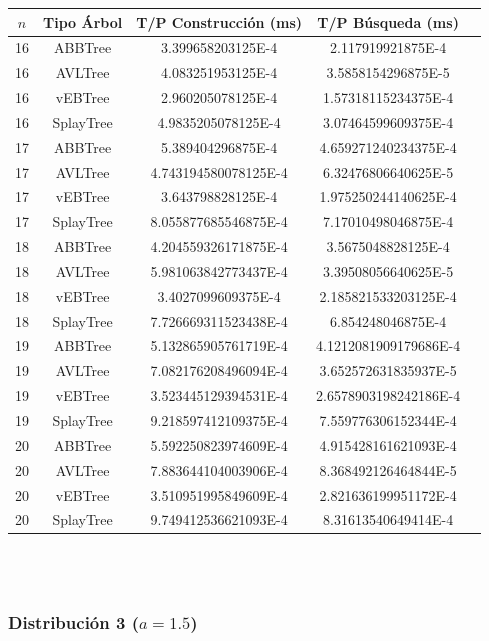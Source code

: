 \documentclass[letterpaper,12pt]{article}
\begin{document}
\begin{tabular}{|c|c|c|c|c|}
\hline
\textbf{$n$} & \textbf{Tipo Árbol} & \textbf{T/P Construcción (ms)} & \textbf{T/P Búsqueda (ms)} \\
\hline
16 & ABBTree & 3.399658203125E-4 & 2.117919921875E-4 \\
\hline
16 & AVLTree & 4.083251953125E-4  & 3.5858154296875E-5 \\
\hline
16 & vEBTree & 2.960205078125E-4  & 1.57318115234375E-4 \\
\hline
16 & SplayTree & 4.9835205078125E-4 & 3.07464599609375E-4 \\
\hline
\hline
17 & ABBTree & 5.389404296875E-4  & 4.659271240234375E-4 \\
\hline
17 & AVLTree & 4.743194580078125E-4 & 6.32476806640625E-5 \\
\hline
17 & vEBTree & 3.643798828125E-4  & 1.975250244140625E-4\\
\hline
17 & SplayTree & 8.055877685546875E-4 & 7.17010498046875E-4 \\
\hline
\hline
18 & ABBTree & 4.204559326171875E-4 & 3.5675048828125E-4 \\
\hline
18 & AVLTree & 5.981063842773437E-4 & 3.39508056640625E-5 \\
\hline
18 & vEBTree & 3.4027099609375E-4 & 2.185821533203125E-4 \\
\hline
18 & SplayTree & 7.726669311523438E-4  & 6.854248046875E-4 \\
\hline
\hline
19 & ABBTree & 5.132865905761719E-4 & 4.1212081909179686E-4 \\
\hline
19 & AVLTree & 7.082176208496094E-4  & 3.652572631835937E-5 \\
\hline
19 & vEBTree & 3.523445129394531E-4 & 2.6578903198242186E-4\\
\hline
19 & SplayTree & 9.218597412109375E-4 & 7.559776306152344E-4 \\
\hline
\hline
20 & ABBTree & 5.592250823974609E-4 & 4.915428161621093E-4 \\
\hline
20 & AVLTree & 7.883644104003906E-4 & 8.368492126464844E-5 \\
\hline
20 & vEBTree & 3.510951995849609E-4 & 2.821636199951172E-4\\
\hline
20 & SplayTree & 9.749412536621093E-4 & 8.31613540649414E-4 \\
\hline
\end{tabular}
\\ \\

\subsubsection{Distribución 3 ($a=1.5$)}
\end{document}
